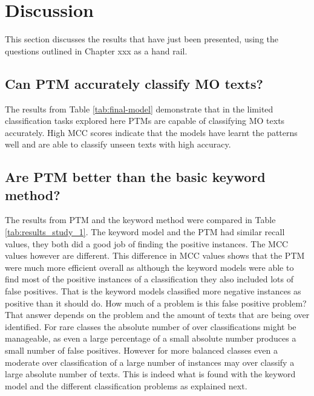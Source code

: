 \section{Discussion} This section discusses the results that have just been presented, using the questions outlined in Chapter xxx as a hand rail.

\subsection{Can PTM accurately classify MO texts? } The results from Table \ref{tab:final-model} demonstrate that in the limited classification tasks explored here PTMs are capable of classifying MO texts accurately. High MCC scores indicate that the models have learnt the patterns well and are able to classify unseen texts with high accuracy. 

\subsection{Are PTM better than the basic keyword method?} The results from PTM and the keyword method were compared in Table \ref{tab:results_study_1}. The keyword model and the PTM had similar recall values, they both did a good job of finding the positive instances. The MCC values however are different. This difference in MCC values shows that the PTM were much more efficient overall as although the keyword models were able to find most of the positive instances of a classification they also included lots of false positives. That is the keyword models classified more negative instances as positive than it should do. How much of a problem is this false positive problem? That answer depends on the problem and the amount of texts that are being over identified. For rare classes the absolute number of over classifications might be manageable, as even a large percentage of a small absolute number produces a small number of false positives. However for more balanced classes even a moderate over classification of a large number of instances may over classify a large absolute number of texts. This is indeed what is found with the keyword model and the different classification problems as explained next.

